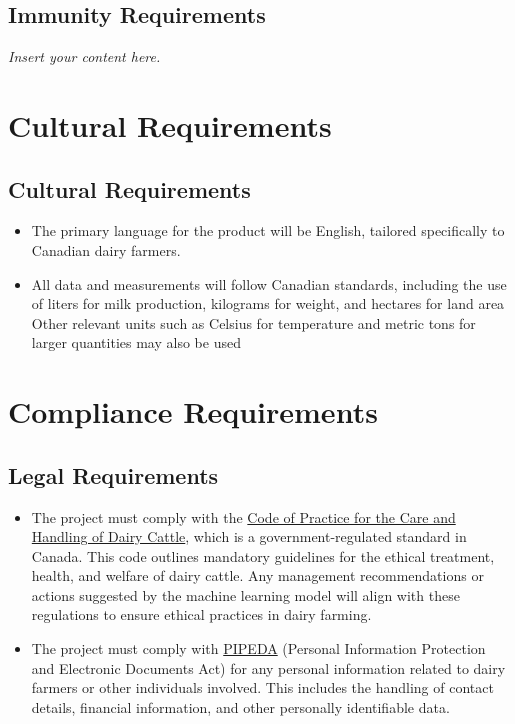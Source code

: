 \documentclass[12pt]{article}
\newcommand{\lips}{\textit{Insert your content here.}}
\begin{document}
\subsection{Immunity Requirements}
\lips

\section{Cultural Requirements}
\subsection{Cultural Requirements}
\begin{itemize}
	\item The primary language for the product will be English, tailored
	      specifically to Canadian dairy farmers. 
	\item All data and measurements will follow Canadian standards, including the
	      use of liters for milk production, kilograms for weight, and hectares
	      for land area Other relevant units such as Celsius for temperature and
	      metric tons for larger quantities may also be used
\end{itemize}

\section{Compliance Requirements}
\subsection{Legal Requirements}
\begin{itemize}
	\item The project must comply with the
	      \href{https://www.nfacc.ca/codes-of-practice/dairy-cattle}{Code of
	      Practice for the Care and Handling of Dairy Cattle}, which is a
	      government-regulated standard in Canada. This code outlines mandatory
	      guidelines for the ethical treatment, health, and welfare of dairy
	      cattle. Any management recommendations or actions suggested by the
	      machine learning model will align with these regulations to ensure
	      ethical practices in dairy farming.
	        
	\item The project must comply with
	      \href{https://laws-lois.justice.gc.ca/pdf/p-8.6.pdf}{PIPEDA} (Personal
	      Information Protection and Electronic Documents Act) for any personal
	      information related to dairy farmers or other individuals involved. This
	      includes the handling of contact details, financial information, and
	      other personally identifiable data.
\end{itemize}
\end{document}

